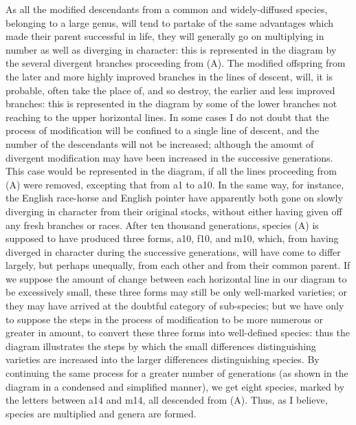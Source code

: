 As all the modified descendants from a common and widely-diffused species, belonging to a large genus, will tend to partake of the same advantages which made their parent successful in life, they will generally go on multiplying in number as well as diverging in character: this is represented in the diagram by the several divergent branches proceeding from (A). The modified offspring from the later and more highly improved branches in the lines of descent, will, it is probable, often take the place of, and so destroy, the earlier and less improved branches: this is represented in the diagram by some of the lower branches not reaching to the upper horizontal lines. In some cases I do not doubt that the process of modification will be confined to a single line of descent, and the number of the descendants will not be increased; although the amount of divergent modification may have been increased in the successive generations. This case would be represented in the diagram, if all the lines proceeding from (A) were removed, excepting that from a1 to a10. In the same way, for instance, the English race-horse and English pointer have apparently both gone on slowly diverging in character from their original stocks, without either having given off any fresh branches or races.
After ten thousand generations, species (A) is supposed to have produced three forms, a10, f10, and m10, which, from having diverged in character during the successive generations, will have come to differ largely, but perhaps unequally, from each other and from their common parent. If we suppose the amount of change between each horizontal line in our diagram to be excessively small, these three forms may still be only well-marked varieties; or they may have arrived at the doubtful category of sub-species; but we have only to suppose the steps in the process of modification to be more numerous or greater in amount, to convert these three forms into well-defined species: thus the diagram illustrates the steps by which the small differences distinguishing varieties are increased into the larger differences distinguishing species. By continuing the same process for a greater number of generations (as shown in the diagram in a condensed and simplified manner), we get eight species, marked by the letters between a14 and m14, all descended from (A). Thus, as I believe, species are multiplied and genera are formed.
